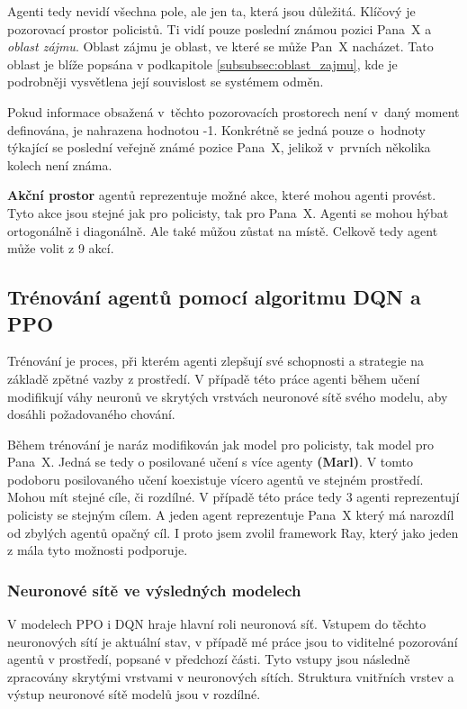 Agenti tedy nevidí všechna pole, ale jen ta, která jsou důležitá.
Klíčový je pozorovací prostor policistů.
Ti vidí pouze poslední známou pozici Pana~X a \emph{oblast zájmu}.
Oblast zájmu je oblast, ve které se může Pan~X nacházet.
Tato oblast je blíže popsána v podkapitole  \ref{subsubsec:oblast_zajmu}, kde je podrobněji vysvětlena její souvislost se systémem odměn.

Pokud informace obsažená v~těchto pozorovacích prostorech není v~daný moment definována, je nahrazena hodnotou -1.
Konkrétně se jedná pouze o~hodnoty týkající se poslední veřejně známé pozice Pana~X, jelikož v~prvních několika kolech není známa.

\bigskip

\textbf{Akční prostor} agentů reprezentuje možné akce, které mohou agenti provést.
Tyto akce jsou stejné jak pro policisty, tak pro Pana~X\@.
Agenti se mohou hýbat ortogonálně i diagonálně.
Ale také můžou zůstat na místě.
Celkově tedy agent může volit z 9 akcí.

\subsection{Trénování agentů pomocí algoritmu DQN a PPO}
Trénování je proces, při kterém agenti zlepšují své schopnosti a strategie na základě zpětné vazby z prostředí.
V případě této práce agenti během učení modifikují váhy neuronů ve skrytých vrstvách neuronové sítě svého modelu, aby dosáhli požadovaného chování.

Během trénování je naráz modifikován jak model pro policisty, tak model pro Pana~X\@.
Jedná se tedy o posilované učení s více agenty \textbf{(Marl)}.
V tomto podoboru posilovaného učení koexistuje vícero agentů ve stejném prostředí.
Mohou mít stejné cíle, či rozdílné.
V případě této práce tedy 3 agenti reprezentují policisty se stejným cílem.
A jeden agent reprezentuje Pana~X který má narozdíl od zbylých agentů opačný cíl.
I proto jsem zvolil framework Ray, který jako jeden z mála tyto možnosti podporuje.

\subsubsection{Neuronové sítě ve výsledných modelech}
\label{subsec:neuronove_site}
V modelech PPO i DQN hraje hlavní roli neuronová síť.
Vstupem do těchto neuronových sítí je aktuální stav, v případě mé práce jsou to viditelné pozorování agentů v prostředí, popsané v předchozí části.
Tyto vstupy jsou následně zpracovány skrytými vrstvami v neuronových sítích.
Struktura vnitřních vrstev a výstup neuronové sítě modelů jsou v rozdílné.
\bigskip

